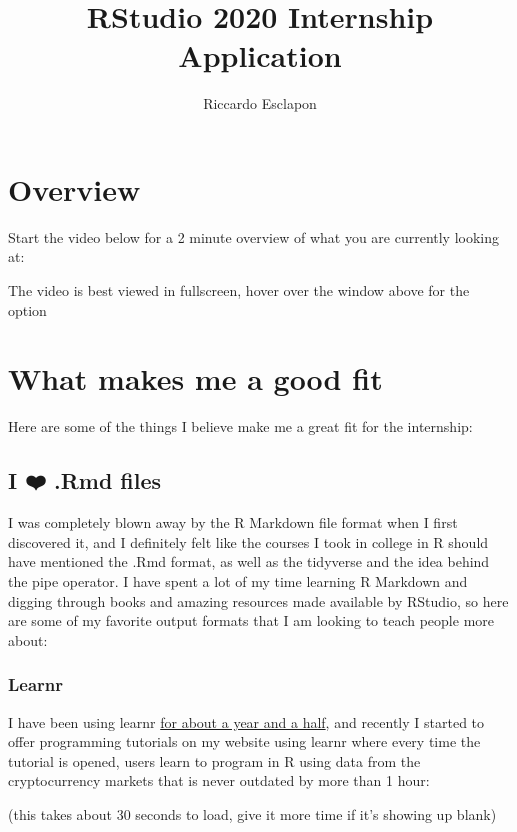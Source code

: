 \documentclass[
]{book}
\title{RStudio 2020 Internship Application}
\author{Riccardo Esclapon}
\date{}
\begin{document}
\maketitle

{
\setcounter{tocdepth}{1}
\tableofcontents
}
\hypertarget{overview}{%
\chapter{Overview}\label{overview}}

Start the video below for a 2 minute overview of what you are currently looking at:

The video is best viewed in fullscreen, hover over the window above for the option

\hypertarget{fit}{%
\chapter{What makes me a good fit}\label{fit}}

Here are some of the things I believe make me a great fit for the internship:

\hypertarget{i-uxfe0f-.rmd-files}{%
\section{I ❤️ .Rmd files}\label{i-uxfe0f-.rmd-files}}

I was completely blown away by the R Markdown file format when I first discovered it, and I definitely felt like the courses I took in college in R should have mentioned the .Rmd format, as well as the tidyverse and the idea behind the pipe operator. I have spent a lot of my time learning R Markdown and digging through books and amazing resources made available by RStudio, so here are some of my favorite output formats that I am looking to teach people more about:

\hypertarget{learnr}{%
\subsection{Learnr}\label{learnr}}

I have been using learnr \href{https://github.com/ries9112/R-Tutorial}{for about a year and a half}, and recently I started to offer programming tutorials on my website using learnr where every time the tutorial is opened, users learn to program in R using data from the cryptocurrency markets that is never outdated by more than 1 hour:

(this takes about 30 seconds to load, give it more time if it's showing up blank)
\end{document}
